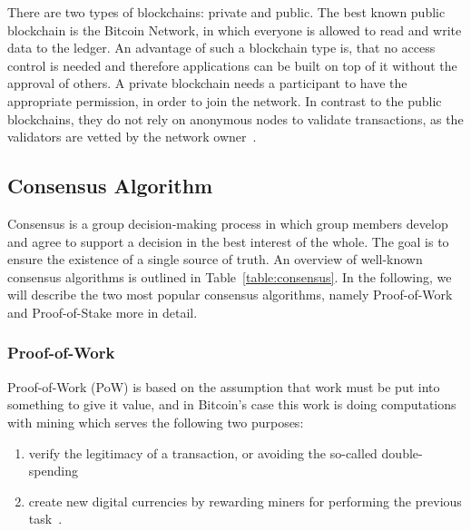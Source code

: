 There are two types of blockchains: private and public. The best known public blockchain is the Bitcoin Network, in which everyone is allowed to read and write data to the ledger.
An advantage of such a blockchain type is, that no access control is needed and therefore applications can be built on top of it without the approval of others.
A private blockchain needs a participant to have the appropriate permission, in order to join the network. In contrast to the public blockchains, they do not rely on anonymous nodes to validate transactions, as the validators are vetted by the network owner~\cite{Private}.

\subsection{Consensus Algorithm}

Consensus is a group decision-making process in which group members develop and agree to support a decision in the best interest of the whole. The goal is to ensure the existence of a single source of truth. An overview of well-known consensus algorithms is outlined in Table~\ref{table:consensus}. In the following, we will describe the two most popular consensus algorithms, namely Proof-of-Work and Proof-of-Stake more in detail.

\subsubsection{Proof-of-Work}

Proof-of-Work (PoW) is based on the assumption that work must be put into something to give it value, and in Bitcoin's case this work is doing computations with mining which serves the following two purposes:
\begin{enumerate}
  \item verify the legitimacy of a transaction, or avoiding the so-called double-spending
  \item create new digital currencies by rewarding miners for performing the previous task~\cite{consensus}.
\end{enumerate}

